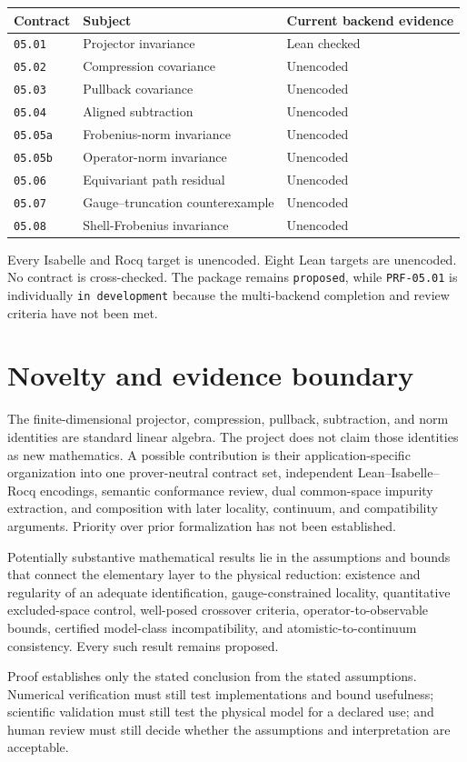 \begin{center}
\small
\begin{tabular}{@{}lll@{}}
\toprule
Contract & Subject & Current backend evidence \\
\midrule
\texttt{05.01} & Projector invariance & Lean checked \\
\texttt{05.02} & Compression covariance & Unencoded \\
\texttt{05.03} & Pullback covariance & Unencoded \\
\texttt{05.04} & Aligned subtraction & Unencoded \\
\texttt{05.05a} & Frobenius-norm invariance & Unencoded \\
\texttt{05.05b} & Operator-norm invariance & Unencoded \\
\texttt{05.06} & Equivariant path residual & Unencoded \\
\texttt{05.07} & Gauge--truncation counterexample & Unencoded \\
\texttt{05.08} & Shell-Frobenius invariance & Unencoded \\
\bottomrule
\end{tabular}
\end{center}

Every Isabelle and Rocq target is unencoded. Eight Lean targets are unencoded.
No contract is cross-checked. The package remains \texttt{proposed}, while
\texttt{PRF-05.01} is individually \texttt{in development} because the
multi-backend completion and review criteria have not been met.

\section{Novelty and evidence boundary}

The finite-dimensional projector, compression, pullback, subtraction, and norm
identities are standard linear algebra. The project does not claim those
identities as new mathematics. A possible contribution is their
application-specific organization into one prover-neutral contract set,
independent Lean--Isabelle--Rocq encodings, semantic conformance review, dual
common-space impurity extraction, and composition with later locality,
continuum, and compatibility arguments. Priority over prior formalization has
not been established.

Potentially substantive mathematical results lie in the assumptions and bounds
that connect the elementary layer to the physical reduction: existence and
regularity of an adequate identification, gauge-constrained locality,
quantitative excluded-space control, well-posed crossover criteria,
operator-to-observable bounds, certified model-class incompatibility, and
atomistic-to-continuum consistency. Every such result remains proposed.

Proof establishes only the stated conclusion from the stated assumptions.
Numerical verification must still test implementations and bound usefulness;
scientific validation must still test the physical model for a declared use;
and human review must still decide whether the assumptions and interpretation
are acceptable.

